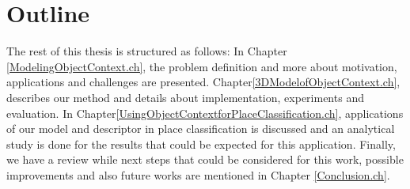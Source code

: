 \section {Outline}
\label{Outline.sec}
The rest of this thesis is structured as follows:
In Chapter \ref{ModelingObjectContext.ch}, the problem definition and more about motivation, applications and 
challenges are presented.
Chapter\ref{3DModelofObjectContext.ch}, describes our method and details about implementation, experiments and evaluation. 
In Chapter\ref{UsingObjectContextforPlaceClassification.ch}, applications of our model and descriptor in place classification is 
discussed and an analytical study is done for the results that could be expected for this application.
Finally, we have a review while next steps that could be considered for this work, possible improvements 
and also future works are mentioned in Chapter \ref{Conclusion.ch}.

